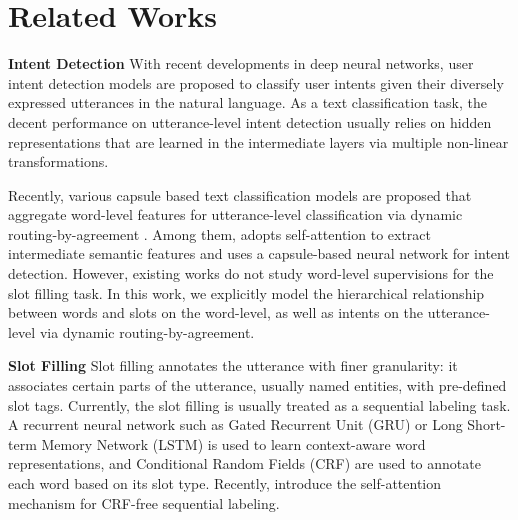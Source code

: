 \section{Related Works}
\noindent\textbf{Intent Detection}
With recent developments in deep neural networks, user intent detection models \citep{hu2009understanding,xu2013convolutional,zhang2016mining,liu2016attention,zhang2017bringing,chen2016end,xia2018zero} are proposed to classify user intents given their diversely expressed utterances in the natural language. As a text classification task, the decent performance on utterance-level intent detection usually relies on hidden representations that are learned in the intermediate layers via multiple non-linear transformations. 

Recently, various capsule based text classification models are proposed that aggregate word-level features for utterance-level classification via dynamic routing-by-agreement \citep{gong2018information,zhao2018investigating,xia2018zero}. Among them, \citet{xia2018zero} adopts self-attention to extract intermediate semantic features and uses a capsule-based neural network for intent detection. 
However, existing works do not study word-level supervisions for the slot filling task. In this work, we explicitly model the hierarchical relationship between words and slots on the word-level, as well as intents on the utterance-level via dynamic routing-by-agreement.

\noindent\textbf{Slot Filling}
Slot filling annotates the utterance with finer granularity: it associates certain parts of the utterance, usually named entities, with pre-defined slot tags. Currently, the slot filling is usually treated as a sequential labeling task. A recurrent neural network such as Gated Recurrent Unit (GRU) or Long Short-term Memory Network (LSTM) is used to learn context-aware word representations, and Conditional Random Fields (CRF) are used to annotate each word based on its slot type. Recently, \citet{shen2017disan, tan2017deep} introduce the self-attention mechanism for CRF-free sequential labeling.

